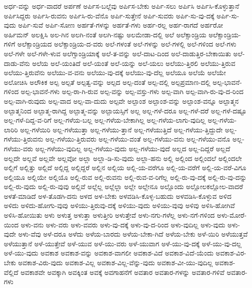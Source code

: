 {ಅರ್ಧ-ವನ್ನು
ಅರ್ಧ-ವಾದರೆ
ಅರ್ಪಣೆ
ಅರ್ಪಿಸ-ಬಲ್ಲೆವು
ಅರ್ಪಿಸ-ಬೇಕು
ಅರ್ಪಿ-ಸಲು
ಅರ್ಪಿಸಿ
ಅರ್ಪಿಸಿ-ಕೊಳ್ಳುತ್ತಾನೆ
ಅರ್ಪಿಸಿದ್ದರು
ಅರ್ಪಿಸಿ-ರುವನು
ಅರ್ಪಿಸಿ-ರು-ವೆನೊ
ಅರ್ಪಿ-ಸುತ್ತೇನೆ
ಅರ್ಪಿ-ಸುವರು
ಅರ್ಪಿ-ಸು-ವು-ದಕ್ಕೆ
ಅರ್ಪಿ-ಸು-ವುದು
ಅರ್ಪಿ-ಸುವೆ
ಅರ್ಪಿ-ಸೋಣ
ಅರ್ಹತೆ-ಗಳನ್ನು
ಅರ್ಹತೆ-ಗಳು
ಅರ್ಹ-ರಲ್ಲ
ಅರ್ಹ-ರಾಗದೆ
ಅರ್ಹರೋ
ಅರ್ಹಿಮನ್
ಅಲಕ್ಷಿಸಿ
ಅಲ-ಗಿನ
ಅಲಗಿ-ನಂತೆ
ಅಲಗಿ-ನಷ್ಟು
ಅಲಮೇಡಾ-ದಲ್ಲಿ
ಅಲೆ
ಅಲೆಕ್ಸಾಂಡ್ರಿಯ
ಅಲೆಕ್ಸಾಂಡ್ರಿಯ-ಗಳಿಗೆ
ಅಲೆಕ್ಸಾಂಡ್ರಿಯದ
ಅಲೆಕ್ಸಾಂಡ್ರಿಯ-ದ-ವರು
ಅಲೆ-ಗಳಂತೆ
ಅಲೆ-ಗಳನ್ನು
ಅಲೆ-ಗಳಲ್ಲಿ
ಅಲೆ-ಗಳಿಂದ
ಅಲೆ-ಗಳು
ಅಲೆ-ಗಳೇ
ಅಲೆ-ಗಳೇ-ಳುವ
ಅಲೆಗ್ಸಾಂಡ್ರಿಯಾಕ್ಕೆ
ಅಲೆ-ತ-ವನ್ನು
ಅಲೆ-ದಾಟ-ದಿಂದ
ಅಲೆ-ದಾಡುತ್ತಿರ-ಬೇಕಾಯಿತು
ಅಲೆ-ದಾಡು-ವೆನು
ಅಲೆಯ
ಅಲೆ-ಯಂತಿದೆ
ಅಲೆ-ಯಂತೆ
ಅಲೆ-ಯನ್ನು
ಅಲೆ-ಯಲು
ಅಲೆಯು-ತ್ತಿರಲಿ
ಅಲೆಯು-ತ್ತಿರುವ
ಅಲೆಯು-ತ್ತಿರುವೆನು
ಅಲೆಯು-ವ-ವನು
ಅಲೆಯು-ವು-ದಕ್ಕೆ
ಅಲೆಯು-ವು-ದೆಲ್ಲ
ಅಲೆಯೂ
ಅಲೆಯೆ
ಅಲೆಯೇ
ಅಲೋಚಿಸಿ
ಅಲೌಕಿಕ
ಅಲ್ಪ
ಅಲ್ಪತೆ
ಅಲ್ಪತ್ವ-ವನ್ನು
ಅಲ್ಪದ
ಅಲ್ಪ-ದಂತೆ
ಅಲ್ಪ-ದಲ್ಲಿ
ಅಲ್ಪಪ್ರಮಾಣ-ದಲ್ಲಿ
ಅಲ್ಪ-ಭಾವನೆ-ಗಳಿಂದ
ಅಲ್ಪ-ಭಾವನೆ-ಗಳು
ಅಲ್ಪ-ರಾ-ಗಿ-ರುವ
ಅಲ್ಪ-ವನ್ನು
ಅಲ್ಪ-ವಸ್ತು-ಗಳು
ಅಲ್ಪ-ವಾಗಿ
ಅಲ್ಪ-ವಾಗಿ-ರು-ವು-ದ-ರಿಂದ
ಅಲ್ಪ-ವಾಗಿ-ರುವುದು
ಅಲ್ಪ-ವಾದ
ಅಲ್ಪ-ವಾ-ದುದು
ಅಲ್ಪವೇ
ಅಲ್ಪಾಂಶ
ಅಲ್ಪಾಂಶ-ವನ್ನು
ಅಲ್ಪಾಂಶ-ವನ್ನೂ
ಅಲ್ಪಾತ್ಮನ
ಅಲ್ಪಾತ್ಮನಿಂದ
ಅಲ್ಪಾತ್ಮ-ರಾಗಿದ್ದ
ಅಲ್ಪಾತ್ಮ-ವನ್ನು
ಅಲ್ಪಾಯಸ್ಸಿಗೆ
ಅಲ್ಲ
ಅಲ್ಲ-ಗಳೆ-ದರೂ
ಅಲ್ಲ-ಗಳೆ-ದರೆ
ಅಲ್ಲ-ಗಳೆ-ದಷ್ಟೂ
ಅಲ್ಲ-ಗಳೆ-ದಿದ್ದ-ವ-ರಿಗೆ
ಅಲ್ಲ-ಗಳೆಯ-ಬಲ್ಲ
ಅಲ್ಲ-ಗಳೆಯ-ಬೇಕಾಗಿಲ್ಲ
ಅಲ್ಲ-ಗಳೆಯ-ಲಾಗು-ವುದಿಲ್ಲ
ಅಲ್ಲ-ಗಳೆಯ-ಲಾರಿರಿ
ಅಲ್ಲ-ಗಳೆಯಿರಿ
ಅಲ್ಲ-ಗಳೆಯುತ್ತಾ
ಅಲ್ಲ-ಗಳೆಯು-ತ್ತಾನೆ
ಅಲ್ಲ-ಗಳೆಯುತ್ತಿದೆ
ಅಲ್ಲ-ಗಳೆಯು-ತ್ತಿದ್ದುದೇ
ಅಲ್ಲ-ಗಳೆಯು-ತ್ತಿರುವನು
ಅಲ್ಲ-ಗಳೆಯು-ತ್ತಿರುವರು
ಅಲ್ಲ-ಗಳೆಯು-ವಂತೆ
ಅಲ್ಲ-ಗಳೆಯು-ವನು
ಅಲ್ಲ-ಗಳೆಯು-ವನೊ
ಅಲ್ಲ-ಗಳೆಯು-ವರು
ಅಲ್ಲ-ಗಳೆಯು-ವುದಿಲ್ಲ
ಅಲ್ಲ-ಗಳೆಯು-ವುದು
ಅಲ್ಲ-ಗಳೆಯು-ವುದೆ
ಅಲ್ಲದ
ಅಲ್ಲ-ದಿದ್ದರೆ
ಅಲ್ಲದೆ
ಅಲ್ಲದೇ
ಅಲ್ಲವೆ
ಅಲ್ಲವೇ
ಅಲ್ಲವೋ
ಅಲ್ಲಾ
ಅಲ್ಲಾ-ಡಿ-ಸು-ವುದು
ಅಲ್ಲಾ-ಹನು
ಅಲ್ಲಿ
ಅಲ್ಲಿಂದ
ಅಲ್ಲಿಂದಲೆ
ಅಲ್ಲಿಂದಲೇ
ಅಲ್ಲಿಗೆ
ಅಲ್ಲಿತ್ತು
ಅಲ್ಲಿದೆ
ಅಲ್ಲಿದ್ದ
ಅಲ್ಲಿದ್ದರೆ
ಅಲ್ಲಿನ
ಅಲ್ಲಿಯ
ಅಲ್ಲಿ-ಯ-ವರೆಗೂ
ಅಲ್ಲಿ-ಯ-ವರೆಗೆ
ಅಲ್ಲಿ-ಯ-ವರೆ-ವಿಗೂ
ಅಲ್ಲಿಯೂ
ಅಲ್ಲಿಯೇ
ಅಲ್ಲಿಯೊ
ಅಲ್ಲಿ-ರುವ
ಅಲ್ಲಿ-ರುವನು
ಅಲ್ಲಿ-ರುವ-ವ-ರಿಗೆಲ್ಲ
ಅಲ್ಲಿ-ರು-ವು-ದಕ್ಕೆ
ಅಲ್ಲಿ-ರು-ವು-ದನ್ನು
ಅಲ್ಲಿ-ರು-ವುದು
ಅಲ್ಲಿ-ರು-ವುವು
ಅಲ್ಲಿವೆ
ಅಲ್ಲೆಲ್ಲ
ಅಲ್ಲೆಲ್ಲಾ
ಅಲ್ಲೇ
ಅಲ್ಲೇನೂ
ಅಲ್ಲೊಂದು
ಅಲ್ಲೋಲಕಲ್ಲೋಲ-ವಾದರೆ
ಅಳತೆ-ಮಾಡಿದೆ
ಅಳ-ತೊಡಗಿ-ದನು
ಅಳದ
ಅಳ-ಬೇಕು
ಅಳವಡಿಸಿ-ಕೊಳ್ಳ-ಬಹುದು
ಅಳವಡಿಸಿ-ಕೊಳ್ಳುವ
ಅಳಿದ
ಅಳಿದು
ಅಳಿದು-ಹೋಗು-ವುವು
ಅಳಿಯು-ತ್ತಿರುವು-ದಕ್ಕೆ
ಅಳಿಯು-ವುದು
ಅಳಿಯು-ವುವು
ಅಳಿವು
ಅಳಿಸಿ-ಹೋಗಿವೆ
ಅಳಿಸಿ-ಹೋಯಿತು
ಅಳು
ಅಳುತ್ತ
ಅಳುತ್ತಾ
ಅಳುತ್ತೀರಿ
ಅಳುತ್ತೇವೆ
ಅಳು-ನಗು-ಗಳೆಲ್ಲ
ಅಳು-ನಗೆ-ಗಳಿಂದ
ಅಳು-ಮೋರೆ-ಯಿಂದ
ಅಳು-ವನು
ಅಳು-ವರು
ಅಳು-ವವರು
ಅಳು-ವು-ದಕ್ಕೆ
ಅಳು-ವು-ದ-ರಿಂದ
ಅಳು-ವುದಿಲ್ಲ
ಅಳು-ವುದು
ಅಳು-ವುದೇ
ಅಳು-ವೆವು
ಅಳೆ-ದರೂ
ಅಳೆದು
ಅಳೆಯ-ಬಾರದು
ಅಳೆಯ-ಬೇಕಾ-ಗಿದೆ
ಅಳೆಯ-ಬೇಕು
ಅಳೆ-ಯಿರಿ
ಅಳೆಯುತ್ತವೆ
ಅಳೆಯುತ್ತಾನೆ
ಅಳೆ-ಯುತ್ತೇವೆ
ಅಳೆ-ಯುವ
ಅಳೆ-ಯು-ವರು
ಅಳೆ-ಯುವಾಗ
ಅಳೆ-ಯು-ವು-ದಕ್ಕೆ
ಅಳೆ-ಯು-ವು-ದಲ್ಲ
ಅಳೆ-ಯು-ವುದು
ಅವಕಾಶ
ಅವಕಾಶ-ವನ್ನು
ಅವಕಾಶ-ವಾಗಲೀ
ಅವಕಾಶ-ವಿದೆ
ಅವಕಾಶ-ವಿದೆ-ಯೆಂದು
ಅವಕಾಶ-ವಿರ-ಬೇಕು
ಅವಕಾಶ-ವಿರು-ವುದು
ಅವಕಾಶ-ವಿಲ್ಲ
ಅವಕಾಶ-ವಿಲ್ಲ-ವೆನ್ನು-ವುದು
ಅವಕಾಶ-ವೀ-ಯು-ವುದಿಲ್ಲ
ಅವಕಾಶ-ವೆಲ್ಲಿದೆ
ಅವಕಾಶವೇ
ಅವಕ್ಕಾಗಿ
ಅವಕ್ಕಿಂತ
ಅವಕ್ಕೆ
ಅವಗಾಹನೆಗೆ
ಅವತಾರ
ಅವತಾರ-ಗಳನ್ನು
ಅವತಾರ-ಗಳಿವೆ
ಅವತಾರ-ಗಳು
}

